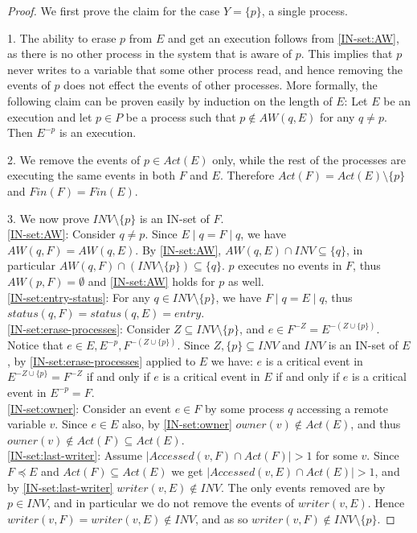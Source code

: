 \begin{proof}  \mbox{}
	
	We first prove the claim for the case $Y = \{p\}$, a single process.
	
	1. The ability to erase $p$ from $E$ and get an execution follows from \ref{IN-set:AW}, as there is no other process in the system that is aware of $p$. This implies that $p$ never writes to a variable that some other process read, and hence removing the events of $p$ does not effect the events of other processes. More formally, the following claim can be proven easily by induction on the length of $E$:
	Let $E$ be an execution and let $p \in P$ be a process such that $p \notin AW(q,E)$ for any $q \neq p$. Then $E^{-p}$ is an execution.
	
	2. We remove the events of $p \in Act(E)$ only, while the rest of the processes are executing the same events in both $F$ and $E$. Therefore $Act(F) = Act(E) \setminus \{p\}$ and $Fin(F) = Fin(E)$.
	
	3. We now prove $INV \setminus \{p\}$ is an IN-set of $F$.
	\\ \ref{IN-set:AW}: Consider $q \neq p$. Since $E \mid q = F \mid q$, we have $AW(q,F) = AW(q,E)$. By \ref{IN-set:AW}, $AW(q,E) \cap INV \subseteq \{q\}$, in particular $AW(q,F) \cap (INV \setminus \{p\}) \subseteq \{q\}$. $p$ executes no events in $F$, thus $AW(p,F) = \emptyset$ and \ref{IN-set:AW} holds for $p$ as well.
	\\ \ref{IN-set:entry-status}: For any $q \in INV \setminus \{p\}$, we have $F \mid q = E \mid q$, thus $status(q,F) = status(q,E) = entry$.	
	\\ \ref{IN-set:erase-processes}: Consider $Z \subseteq INV \setminus \{p\}$, and $e \in F^{-Z} = E^{-(Z \cup \{p\})}$. Notice that $e \in E, E^{-p}, F^{-(Z \cup \{p\})}$.  Since $Z, \{p\} \subseteq INV$ and $INV$ is an IN-set of $E$, by \ref{IN-set:erase-processes} applied to $E$ we have: $e$ is a critical event in $E^{-Z \cup \{p\}} = F^{-Z}$ if and only if $e$ is a critical event in $E$ if and only if $e$ is a critical event in $E^{-p} = F$.
	\\ \ref{IN-set:owner}: Consider an event $e \in F$ by some process $q$ accessing a remote variable $v$. Since $e \in E$ also, by \ref{IN-set:owner} $owner(v) \notin Act(E)$, and thus $owner(v) \notin Act(F) \subseteq Act(E)$.
	\\ \ref{IN-set:last-writer}: Assume $|Accessed(v,F) \cap Act(F)| > 1$ for some $v$. Since $F \preceq E$ and $Act(F) \subseteq Act(E)$ we get $|Accessed(v,E) \cap Act(E)| > 1$, and by \ref{IN-set:last-writer} $writer(v,E) \notin INV$. The only events removed are by $p \in INV$, and in particular we do not remove the events of $writer(v,E)$. Hence $writer(v,F) = writer(v,E) \notin INV$, and as so $writer(v,F) \notin INV \setminus \{p\}$.
	

\end{proof}
